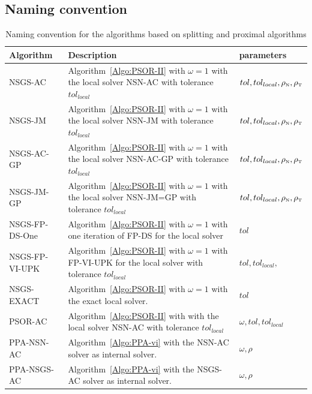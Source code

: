 \subsection{Naming convention}
\begin{table}
  \centering
  \begin{tabular}{|l|p{}|l|}
    \hline
    { Algorithm}
    & Description 
    & parameters\\
    \hline
    \sf NSGS-AC
    & Algorithm~\ref{Algo:PSOR-II} with $\omega=1$ with the local solver NSN-AC with tolerance $tol_{local}$
    & $tol, tol_{local},  \rho_{\hbox{\tiny{N}}}, \rho_{\hbox{\tiny{T}}}$\\
    \hline
    \sf NSGS-JM
    & Algorithm~\ref{Algo:PSOR-II} with $\omega=1$ with the local solver NSN-JM with tolerance $tol_{local}$
    & $tol, tol_{local}, \rho_{\hbox{\tiny{N}}}, \rho_{\hbox{\tiny{T}}}$\\
    \hline
    \sf NSGS-AC-GP
    & Algorithm~\ref{Algo:PSOR-II} with $\omega=1$ with the local solver NSN-AC-GP with tolerance $tol_{local}$
    & $tol, tol_{local}, \rho_{\hbox{\tiny{N}}}, \rho_{\hbox{\tiny{T}}}$\\
    \hline
    \sf NSGS-JM-GP
    & Algorithm~\ref{Algo:PSOR-II} with $\omega=1$ with the local solver NSN-JM=GP with tolerance $tol_{local}$
    & $tol, tol_{local}, \rho_{\hbox{\tiny{N}}}, \rho_{\hbox{\tiny{T}}}$\\
    \hline
    \sf NSGS-FP-DS-One
    & Algorithm~\ref{Algo:PSOR-II} with $\omega=1$ with one iteration of FP-DS for the local solver
    & $tol$\\
    \hline
    \sf NSGS-FP-VI-UPK
    & Algorithm~\ref{Algo:PSOR-II} with $\omega=1$ with FP-VI-UPK for the local solver with tolerance $tol_{local}$
    & $tol, tol_{local}, $\\
    \hline
    \sf NSGS-EXACT
    & Algorithm~\ref{Algo:PSOR-II} with $\omega=1$ with the exact local solver.
    & $tol$\\
    \hline
    \hline
    \sf PSOR-AC 
    &  Algorithm~\ref{Algo:PSOR-II} with  with the local solver NSN-AC with tolerance $tol_{local}$
    & $\omega, tol,  tol_{local}$\\
    \hline
    \hline
    \sf PPA-NSN-AC 
    &  Algorithm~\ref{Algo:PPA-vi} with the NSN-AC solver as internal solver.
    & $\omega,\rho$\\
    \hline
    \sf PPA-NSGS-AC
    &  Algorithm~\ref{Algo:PPA-vi} with the NSGS-AC solver as internal solver.
    & $\omega,\rho$\\
    \hline
  \end{tabular}
  \caption{Naming convention for the algorithms based on splitting and proximal algorithms}
  \label{tab:PSOR-PPA-algos}
\end{table}

